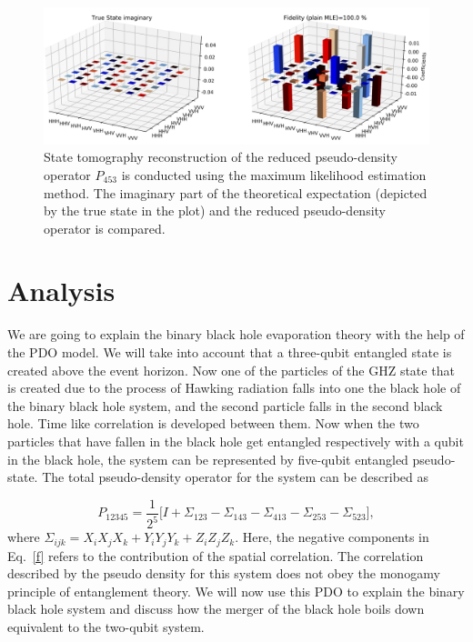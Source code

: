 \documentclass[fleqn,usenatbib]{mnras}
\begin{document}
\begin{figure}
\centering
\includegraphics[width=\textwidth]{plots/interaction_three_d_plot_imaginary_plain MLE_crop.png}
    \caption{ State tomography reconstruction of the reduced pseudo-density operator $P_{453}$ is conducted using the maximum likelihood estimation method. The imaginary part of the theoretical expectation (depicted by the true state in the plot) and the reduced pseudo-density operator is compared.}
    \label{f12}
\end{figure}



\section{Analysis}\label{sec3}
We are going to explain the binary black hole evaporation theory with the help of the PDO model.  We will take into account that a three-qubit entangled state is created above the event horizon. Now one of the particles of the GHZ state that is created due to the process of Hawking radiation falls into one the black hole of the binary black hole system, and the second particle falls in the second black hole. Time like correlation is developed between them. Now when the two particles that have fallen in the black hole get entangled respectively with a qubit in the black hole, the system can be represented by five-qubit entangled pseudo-state. The total pseudo-density operator for the system can be described as 

\begin{equation}\label{f}
    P_{12345} = \frac{1}{2^5} \Big[I + \Sigma_{123}- \Sigma_{143}-\Sigma_{413}-\Sigma_{253}-\Sigma_{523} \Big],
\end{equation}
where $\Sigma_{ijk}= X_iX_jX_k + Y_iY_jY_k +Z_iZ_jZ_k$. Here, the negative components in Eq.~\eqref{f} refers to the contribution of the spatial correlation. The correlation described by the pseudo density for this system does not obey the monogamy principle of entanglement theory. We will now use this PDO to explain the binary black hole system and discuss how the merger of the black hole boils down equivalent to the two-qubit system. 
\end{document}

